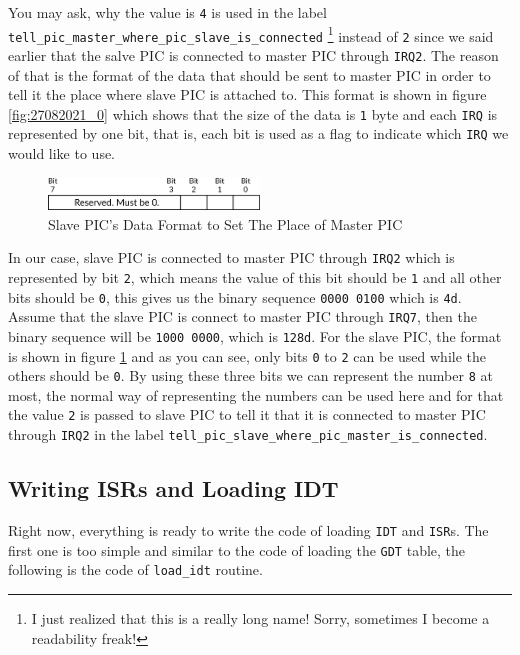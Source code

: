 You may ask, why the value is \lstinline!4! is used in the label
\texttt{tell\_pic\_master\_where\_pic\_slave\_is\_connected} \footnote{I
  just realized that this is a really long name! Sorry, sometimes I
  become a readability freak!} instead of \lstinline!2! since we said
earlier that the salve PIC is connected to master PIC through
\lstinline!IRQ2!. The reason of that is the format of the data that
should be sent to master PIC in order to tell it the place where slave
PIC is attached to. This format is shown in figure \ref{fig:27082021_0}
which shows that the size of the data is \lstinline!1! byte and each
\lstinline!IRQ! is represented by one bit, that is, each bit is used as
a flag to indicate which \lstinline!IRQ! we would like to use.

\begin{figure}
\centering
\includegraphics[width=0.50000\textwidth]{Figures/progenitor-ch/Fig27082021_1.png}
\caption{Slave PIC's Data Format to Set The Place of Master
PIC}\label{fig:27082021_1}
\end{figure}

In our case, slave PIC is connected to master PIC through
\lstinline!IRQ2! which is represented by bit \lstinline!2!, which means
the value of this bit should be \lstinline!1! and all other bits should
be \lstinline!0!, this gives us the binary sequence
\lstinline!0000 0100! which is \lstinline!4d!. Assume that the slave PIC
is connect to master PIC through \lstinline!IRQ7!, then the binary
sequence will be \lstinline!1000 0000!, which is \lstinline!128d!. For
the slave PIC, the format is shown in figure \ref{fig:27082021_1} and as
you can see, only bits \lstinline!0! to \lstinline!2! can be used while
the others should be \lstinline!0!. By using these three bits we can
represent the number \lstinline!8! at most, the normal way of
representing the numbers can be used here and for that the value
\lstinline!2! is passed to slave PIC to tell it that it is connected to
master PIC through \lstinline!IRQ2! in the label
\lstinline!tell_pic_slave_where_pic_master_is_connected!.

\subsection{Writing ISRs and Loading
IDT}\label{writing-isrs-and-loading-idt}

Right now, everything is ready to write the code of loading
\lstinline!IDT! and \lstinline!ISR!s. The first one is too simple and
similar to the code of loading the \lstinline!GDT! table, the following
is the code of \lstinline!load_idt! routine.

